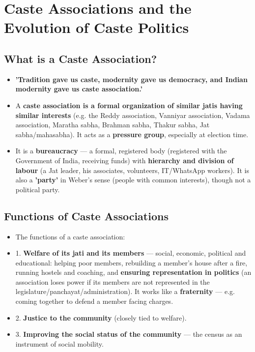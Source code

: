 \section{Caste Associations and the Evolution of Caste Politics}

\subsection{What is a Caste Association?}

\begin{KeyConcept}
\begin{itemize}
\item \textbf{'Tradition gave us caste, modernity gave us democracy, and Indian modernity gave us caste association.'}
\item A \textbf{caste association is a formal organization of similar jatis having similar interests} (e.g. the Reddy association, Vanniyar association, Vadama association, Maratha sabha, Brahman sabha, Thakur sabha, Jat sabha/mahasabha). It acts as a \textbf{pressure group}, especially at election time.
\item It is a \textbf{bureaucracy} --- a formal, registered body (registered with the Government of India, receiving funds) with \textbf{hierarchy and division of labour} (a Jat leader, his associates, volunteers, IT/WhatsApp workers). It is also a \textbf{'party'} in Weber's sense (people with common interests), though not a political party.
\end{itemize}
\end{KeyConcept}

\subsection{Functions of Caste Associations}

\begin{KeyConcept}
\begin{itemize}
\item The functions of a caste association:
\item 1. \textbf{Welfare of its jati and its members} --- social, economic, political and educational: helping poor members, rebuilding a member's house after a fire, running hostels and coaching, and \textbf{ensuring representation in politics} (an association loses power if its members are not represented in the legislature/panchayat/administration). It works like a \textbf{fraternity} --- e.g. coming together to defend a member facing charges.
\item 2. \textbf{Justice to the community} (closely tied to welfare).
\item 3. \textbf{Improving the social status of the community} --- the census as an instrument of social mobility.
\end{itemize}
\end{KeyConcept}

